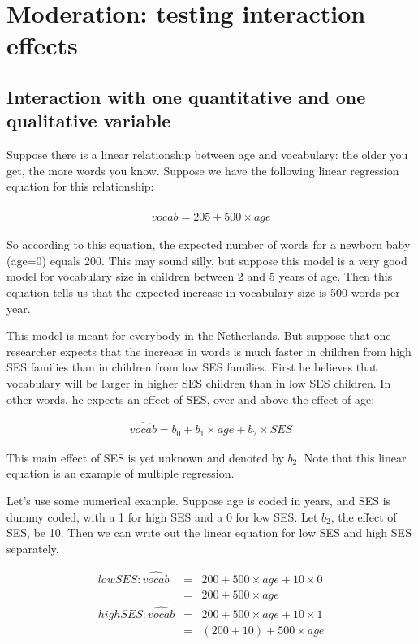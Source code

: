 \documentclass[]{report}\usepackage[]{graphicx}\usepackage[]{color}
\begin{document}
\chapter{Moderation: testing interaction effects}\label{chap:moderation}





\section{Interaction with one quantitative and one qualitative variable}

Suppose there is a linear relationship between age and vocabulary: the older you get, the more words you know. Suppose we have the following linear regression equation for this relationship:


\begin{eqnarray}
\widehat{vocab} = 205 + 500 \times age 
\end{eqnarray}

So according to this equation, the expected number of words for a newborn baby (age=0) equals 200. This may sound silly, but suppose this model is a very good model for vocabulary size in children between 2 and 5 years of age. Then this equation tells us that the expected increase in vocabulary size is 500 words per year.

This model is meant for everybody in the Netherlands. But suppose that one researcher expects that the increase in words is much faster in children from high SES families than in children from low SES families. First he believes that vocabulary will be larger in higher SES children than in low SES children. In other words, he expects an effect of SES, over and above the effect of age:

\begin{eqnarray}
\widehat{vocab} = b_0 + b_1 \times age + b_2 \times SES
\end{eqnarray}

This main effect of SES is yet unknown and denoted by $b_2$. Note that this linear equation is an example of multiple regression.


Let's use some numerical example. Suppose age is coded in years, and SES is dummy coded, with a 1 for high SES and a 0 for low SES. Let $b_2$, the effect of SES, be 10. Then we can write out the linear equation for low SES and high SES separately.


\begin{eqnarray}
low SES: \widehat{vocab} &=& 200 + 500 \times age + 10 \times 0  \\
&=& 200 + 500 \times age \\
high SES: \widehat{vocab} &=& 200 + 500 \times age + 10 \times 1  \\
&=& (200+10) + 500 \times age
\end{eqnarray}
\end{document}
